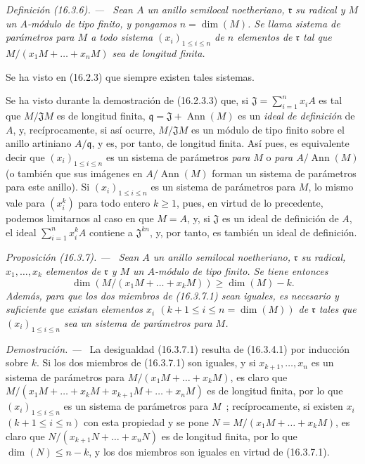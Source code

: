 \documentclass[10pt,oneside]{book}
\makeatletter
\newcommand{\setmanualcurrentlabel}[1]{\def\@currentlabel{#1}}
\newenvironment{definition}[1][]{%
  \setmanualcurrentlabel{#1}\par\medskip\noindent\itshape Definición (#1). ---\ }{\par}
\newenvironment{proposition}[1][]{%
  \setmanualcurrentlabel{#1}\par\medskip\noindent\itshape Proposición (#1). ---\ }{\par}
\newenvironment{proof}{%
  \par\medskip\noindent\textit{Demostración. ---\ }}{\par}
\providecommand{\setmin}{-}%
\makeatother
\begin{document}
\begin{definition}[16.3.6]
\label{0.16.3.6-es}
Sean $A$ un anillo semilocal noetheriano, $\mathfrak{r}$ su radical y $M$ un
$A$-módulo de tipo finito, y pongamos $n=\dim(M)$. Se llama sistema de
parámetros para $M$ a todo sistema $(x_i)_{1\leq i\leq n}$ de $n$ elementos de
$\mathfrak{r}$ tal que $M/(x_1M+\ldots+x_nM)$ sea de longitud finita.
\end{definition}

Se ha visto en (16.2.3) que siempre existen tales sistemas.

Se ha visto durante la demostración de (16.2.3.3) que, si
$\mathfrak{J}=\sum_{i=1}^n x_iA$ es tal que $M/\mathfrak{J}M$ es de
longitud finita, $\mathfrak{q}=\mathfrak{J}+\operatorname{Ann}(M)$ es un
\emph{ideal de definición} de $A$, y, recíprocamente, si así ocurre,
$M/\mathfrak{J}M$ es un módulo de tipo finito sobre el anillo artiniano
$A/\mathfrak{q}$, y es, por tanto, de longitud finita. Así pues, es equivalente decir
que $(x_i)_{1\leq i\leq n}$ es un sistema de parámetros \emph{para $M$} o
\emph{para $A/\operatorname{Ann}(M)$} (o también que sus imágenes en
$A/\operatorname{Ann}(M)$ forman un sistema de parámetros para este anillo).
Si $(x_i)_{1\leq i\leq n}$ es un sistema de parámetros para $M$, lo mismo vale
para $(x_i^k)$ para todo entero $k\geq1$, pues, en virtud de lo precedente,
podemos limitarnos al caso en que $M=A$, y, si $\mathfrak{J}$ es un ideal de
definición de $A$, el ideal $\sum_{i=1}^n x_i^kA$ contiene a
$\mathfrak{J}^{kn}$, y, por tanto, es también un ideal de definición.

\begin{proposition}[16.3.7]
\label{0.16.3.7-es}
Sean $A$ un anillo semilocal noetheriano, $\mathfrak{r}$ su radical,
$x_1,\ldots,x_k$ elementos de $\mathfrak{r}$ y $M$ un $A$-módulo de tipo
finito. Se tiene entonces
\begin{equation}
\label{0.16.3.7.1-es}
\tag{16.3.7.1}
  \dim(M/(x_1M+\ldots+x_kM))\geq\dim(M)\setmin k.
\end{equation}
Además, para que los dos miembros de \textup{(16.3.7.1)} sean iguales, es necesario y
suficiente que existan elementos $x_i$
$(k+1\leq i\leq n=\dim(M))$ de $\mathfrak{r}$ tales que
$(x_i)_{1\leq i\leq n}$ sea un sistema de parámetros para $M$.
\end{proposition}

\begin{proof}
La desigualdad (16.3.7.1) resulta de (16.3.4.1) por inducción sobre $k$. Si los
dos miembros de (16.3.7.1) son iguales, y si $x_{k+1},\ldots,x_n$ es un
sistema de parámetros para $M/(x_1M+\ldots+x_kM)$, es claro que
$M/(x_1M+\ldots+x_kM+x_{k+1}M+\ldots+x_nM)$ es de longitud finita, por lo que
$(x_i)_{1\leq i\leq n}$ es un sistema de parámetros para $M$~;
recíprocamente, si existen $x_i$ $(k+1\leq i\leq n)$ con esta propiedad y se
pone $N=M/(x_1M+\ldots+x_kM)$, es claro que
$N/(x_{k+1}N+\ldots+x_nN)$ es de longitud finita, por lo que
$\dim(N)\leq n\setmin k$, y los dos miembros son iguales en virtud de (16.3.7.1).
\end{proof}
\end{document}
